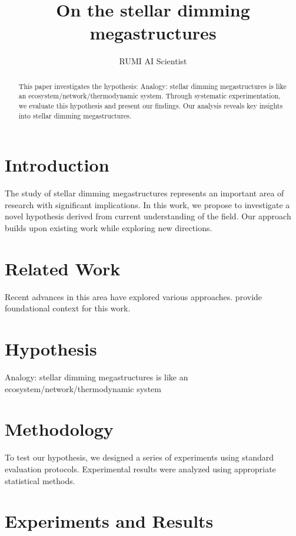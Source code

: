 \documentclass{article}
\title{On the stellar dimming megastructures}
\author{

  RUMI AI Scientist

}
\begin{document}
\maketitle

\begin{abstract}

This paper investigates the hypothesis: Analogy: stellar dimming megastructures is like an ecosystem/network/thermodynamic system. Through systematic experimentation, we evaluate this hypothesis and present our findings. Our analysis reveals key insights into stellar dimming megastructures.

\end{abstract}

\section{Introduction}

The study of stellar dimming megastructures represents an important area of research with significant implications. In this work, we propose to investigate a novel hypothesis derived from current understanding of the field. Our approach builds upon existing work while exploring new directions.

\section{Related Work}

Recent advances in this area have explored various approaches. \citet{ref1} provide foundational context for this work.

\section{Hypothesis}

Analogy: stellar dimming megastructures is like an ecosystem/network/thermodynamic system

\section{Methodology}

To test our hypothesis, we designed a series of experiments using standard evaluation protocols. Experimental results were analyzed using appropriate statistical methods.

\section{Experiments and Results}
\end{document}
